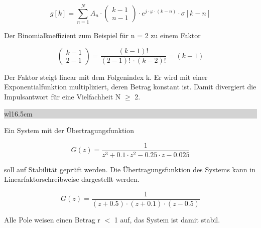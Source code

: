 \begin{equation}\label{eq:sixsonehundredfifteen}
g\left[k\right]=\sum _{n=1}^{N}A_{n} \cdot \left(\begin{array}{c} {k-1} \\ {n-1} \end{array}\right)\cdot e^{j\cdot \varphi \cdot \left(k-n\right)} \cdot \sigma \left[k-n\right]
\end{equation}

\noindent Der Binomialkoeffizient zum Beispiel f\"{u}r n = 2 zu einem Faktor

\begin{equation}\label{eq:sixsonehundredsixteen}
\left(\begin{array}{c} {k-1} \\ {2-1} \end{array}\right)=\frac{\left(k-1\right)!}{\left(2-1\right)!\, \cdot \left(k-2\right)!} =\left(k-1\right)
\end{equation}

\noindent Der Faktor steigt linear mit dem Folgenindex k. Er wird mit einer Exponentialfunktion multipliziert, deren Betrag konstant ist. Damit divergiert die Impulsantwort f\"{u}r eine Vielfachheit N $\geq$ 2.\bigskip

\noindent
\colorbox{lightgray}{%
%
\renewcommand\arraystretch{0.6}%
\begin{tabular}{ wl{16.5cm} }
{}
\end{tabular}%
}\medskip

\noindent Ein System mit der \"{U}bertragungsfunktion 

\begin{equation}\label{eq:sixsonehundredseventeen}
G\left(z\right)=\frac{1}{z^{3} +0.1\cdot z^{2} -0.25\cdot z-0.025}
\end{equation}

\noindent soll auf Stabilit\"{a}t gepr\"{u}ft werden. Die \"{U}bertragungsfunktion des Systems kann in Linearfaktorschreibweise dargestellt werden.

\begin{equation}\label{eq:sixsonehundredeighteen}
G\left(z\right)=\frac{1}{\left(z+0.5\right)\cdot \left(z+0.1\right)\cdot \left(z-0.5\right)}
\end{equation}

\noindent Alle Pole weisen einen Betrag r $\mathrm{<}$ 1 auf, das System ist damit stabil.\bigskip

